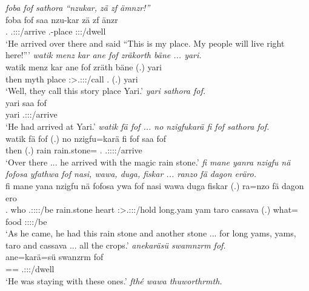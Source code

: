 \begin{exe}
	\emph{foba fof sathora ``nzukar, zä zf ämnzr!''}\\
	\gll foba fof saa nzu-kar zä zf änzr\\ 
	\Dist.{\Abl} {\Emph} \Tsg.\Masc:\Sbj:\Pst:\Pfv/arrive \Fsg.\Poss-place {\Prox} {\Imm} \Stpl:\Sbj:\Nonpast:\Ipfv/dwell\\
	\trans `He arrived over there and said ``This is my place. My people will live right here!'''
	\emph{watik menz kar ane fof zräkorth bäne ... yari.}\\
	\gll watik menz kar ane fof zräth bäne (.) yari\\ 
	then myth place {\Dem} {\Emph} \Stpl:\Sbj>\Tsg.\F:\Obj:\Irr:\Pfv/call \Recog.{\Abs} (.) yari\\
	\trans `Well, they call this story place Yari.'
	\emph{yari sathora fof.}\\
	\gll yari saa fof\\ 
	yari \Tsg.\Masc:\Sbj:\Pst:\Pfv/arrive {\Emph}\\
	\trans `He had arrived at Yari.'
	\emph{watik fä fof ... no nzigfukarä fi fof sathora fof.}\\
	\gll watik fä fof (.) no nzigfu=karä fi fof saa fof\\ 
	then {\Dist} {\Emph} (.) rain rain.stone={\Prop} \Third.{\Abs} {\Emph} \Tsg.\Masc:\Sbj:\Pst:\Pfv:\Venit/arrive {\Emph}\\
	\trans `Over there ... he arrived with the magic rain stone.'
	\emph{fi mane yanra nzigfu nä fofosa yfathwa fof nasi, wawa, duga, fiskar ... ranzo fä dagon eräro.}\\
	\gll fi mane yana nzigfu nä fofosa ywa fof nasi wawa duga fiskar (.) ra=nzo fä dagon ero\\ 
	\Third.{\Abs} who \Tsg.\Masc:\Sbj:\Pst:\Ipfv:\Venit/be rain.stone {\Indf} heart \Sg:\Sbj>\Tsg.\Masc:\Obj:\Pst:\Ipfv/hold {\Emph} long.yam yam taro cassava (.) what={\Only} {\Dist} food \Stpl:\Sbj:\Nonpast:\Ipfv:\Andat/be\\
	\trans `As he came, he had this rain stone and another stone ... for long yams, yams, taro and cassava ... all the crops.'
	\emph{anekaräsü swamnzrm fof.}\\
	\gll ane=karä=sü swanzrm fof\\ 
	\Dem=\Prop=\Etc{} \Tsg.\Masc:\Sbj:\Pst:\Dur/dwell {\Emph}\\
	\trans `He was staying with these ones.'
	\emph{fthé wawa thuworthrmth.}\\

\end{exe}
